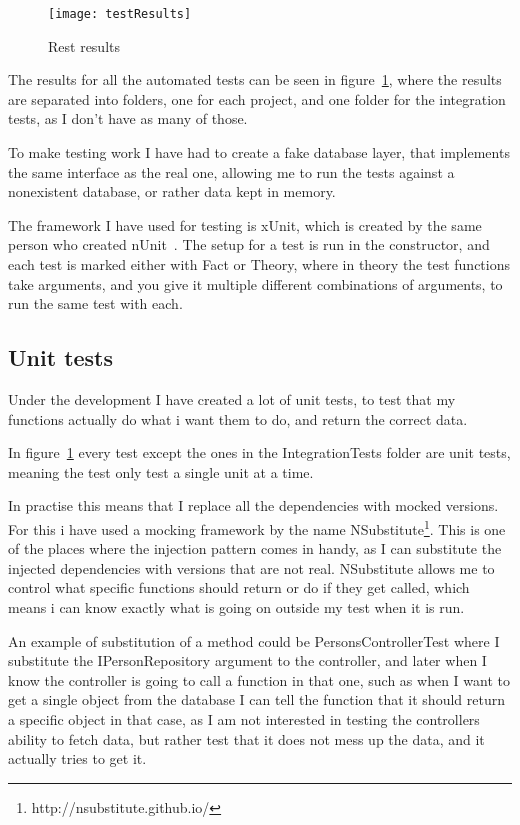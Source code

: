 \begin{figure}[h]
  \centering
  \texttt{[image: testResults]}
  \caption{Rest results}
  \label{fig:testResults}
\end{figure}

The results for all the automated tests can be seen in
figure~\ref{fig:testResults}, where the results are separated into folders, one
for each project, and one folder for the integration tests, as I don't have as
many of those.

To make testing work I have had to create a fake database layer, that implements
the same interface as the real one, allowing me to run the tests against a
nonexistent database, or rather data kept in memory.

The framework I have used for testing is xUnit, which is created by the same
person who created nUnit~\cite{xunit}. The setup for a test is run in the
constructor, and each test is marked either with Fact or Theory, where in theory
the test functions take arguments, and you give it multiple different
combinations of arguments, to run the same test with each.

\subsection{Unit tests}
\label{sec:unit_tests}
Under the development I have created a lot of unit tests, to test that my
functions actually do what i want them to do, and return the correct data.

In figure~\ref{fig:testResults} every test except the ones in the
IntegrationTests folder are unit tests, meaning the test only test a single unit
at a time.

In practise this means that I replace all the dependencies with mocked versions.
For this i have used a mocking framework by the name
NSubstitute\footnote{http://nsubstitute.github.io/}. This is one of the places
where the injection pattern comes in handy, as I can substitute the injected
dependencies with versions that are not real. NSubstitute allows me to control
what specific functions should return or do if they get called, which means i
can know exactly what is going on outside my test when it is run.

An example of substitution of a method could be PersonsControllerTest where I
substitute the IPersonRepository argument to the controller, and later when I
know the controller is going to call a function in that one, such as when I want
to get a single object from the database I can tell the function that it should
return a specific object in that case, as I am not interested in testing the
controllers ability to fetch data, but rather test that it does not mess up the
data, and it actually tries to get it. 

